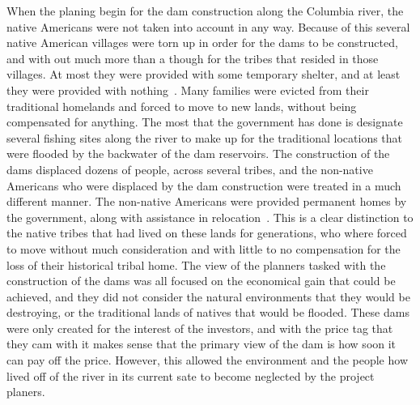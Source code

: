 \documentclass[12pt,twoside]{article}
\begin{document}
When the planing begin for the dam construction along the Columbia river, the native Americans were not taken into account in any way. Because of this several native American villages were torn up in order for the dams to be constructed, and with out much more than a though for the tribes that resided in those villages. At most they were provided with some temporary shelter, and at least they were provided with nothing~\cite{ST}. Many families were evicted from their traditional homelands and forced to move to new lands, without being compensated for anything. The most that the government has done is designate several fishing sites along the river to make up for the traditional locations that were flooded by the backwater of the dam reservoirs. The construction of the dams displaced dozens of people, across several tribes, and the non-native Americans who were displaced by the dam construction were treated in a much different manner. The non-native Americans were provided permanent homes by the government, along with assistance in relocation~\cite{ST}. This is a clear distinction to the native tribes that had lived on these lands for generations, who where forced to move without much consideration and with little to no compensation for the loss of their historical tribal home. The view of the planners tasked with the construction of the dams was all focused on the economical gain that could be achieved, and they did not consider the natural environments that they would be destroying, or the traditional lands of natives that would be flooded. These dams were only created for the interest of the investors, and with the price tag that they cam with it makes sense that the primary view of the dam is how soon it can pay off the price. However, this allowed the environment and the people how lived off of the river in its current sate to become neglected by the project planers. 
\par
\end{document}
